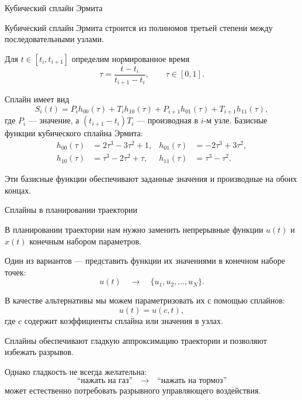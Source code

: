 \documentclass{beamer}
\begin{document}
	\begin{frame}{Кубический сплайн Эрмита}
		\begin{flushleft}
			Кубический сплайн Эрмита строится из полиномов третьей степени
			между последовательными узлами.
			
			\vspace{0.5em}
			
			Для $t\in[t_i,t_{i+1}]$ определим нормированное время
			\[
			\tau
			=
			\frac{t-t_i}{t_{i+1}-t_i},
			\qquad
			\tau\in[0,1].
			\]
			
			Сплайн имеет вид
			\[
			S_i(t)
			=
			P_i h_{00}(\tau)
			+
			T_i h_{10}(\tau)
			+
			P_{i+1} h_{01}(\tau)
			+
			T_{i+1} h_{11}(\tau),
			\]
			где $P_i$ --- значение, а $(t_{i+1}-t_i)T_i$ --- производная
			в $i$-м узле. Базисные функции кубического сплайна Эрмита:
			\[
			\begin{aligned}
				h_{00}(\tau) &= 2\tau^3-3\tau^2+1, & h_{01}(\tau) &= -2\tau^3+3\tau^2, \\
				h_{10}(\tau) &= \tau^3-2\tau^2+\tau, & h_{11}(\tau) &= \tau^3-\tau^2.
			\end{aligned}
			\]
			
			
			Эти базисные функции обеспечивают заданные значения
			и производные на обоих концах.
		\end{flushleft}
	\end{frame}
	
	
	
	\begin{frame}{Сплайны в планировании траектории}
		\begin{flushleft}
			{\small
			
			В планировании траектории нам нужно заменить непрерывные
			функции $u(t)$ и $x(t)$ конечным набором параметров.
			
			\vspace{0.5em}
			
			Один из вариантов --- представить функции их значениями
			в конечном наборе точек:
			\[
			u(t)
			\quad\longrightarrow\quad
			\{u_1,u_2,\ldots,u_N\}.
			\]
			
			В качестве альтернативы мы можем параметризовать их с помощью сплайнов:
			\[
			u(t)=u(c,t),
			\]
			где $c$ содержит коэффициенты сплайна или значения в узлах.
			
			\vspace{0.3em}
			
			Сплайны обеспечивают гладкую аппроксимацию траектории
			и позволяют избежать разрывов.
			
			\vspace{0.3em}
			
			Однако гладкость не всегда желательна:
			\[
			\text{``нажать на газ''}
			\quad\longrightarrow\quad
			\text{``нажать на тормоз''}
			\]
			может естественно потребовать разрывного управляющего воздействия.
		}
		\end{flushleft}
	\end{frame}
	
\end{document}
